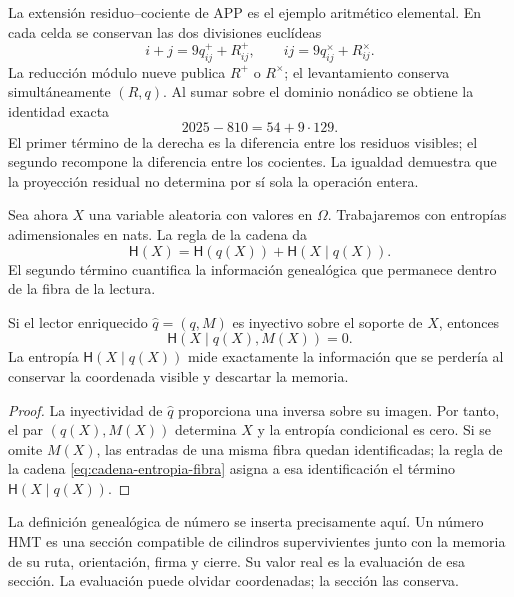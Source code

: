 La extensión residuo--cociente de APP es el ejemplo aritmético elemental. En
cada celda se conservan las dos divisiones euclídeas
\[
 i+j=9q^+_{ij}+R^+_{ij},
 \qquad
 ij=9q^\times_{ij}+R^\times_{ij}.
\]
La reducción módulo nueve publica \(R^+\) o \(R^\times\); el levantamiento
conserva simultáneamente \((R,q)\). Al sumar sobre el dominio nonádico se
obtiene la identidad exacta
\begin{equation}
 2025-810
 =54+9\cdot129.
 \label{eq:app-residuo-cociente-informacion}
\end{equation}
El primer término de la derecha es la diferencia entre los residuos visibles;
el segundo recompone la diferencia entre los cocientes. La igualdad demuestra
que la proyección residual no determina por sí sola la operación entera.

Sea ahora \(X\) una variable aleatoria con valores en \(\Omega\). Trabajaremos
con entropías adimensionales en nats. La regla de la cadena da
\begin{equation}
 \mathsf H(X)
 =\mathsf H(q(X))+\mathsf H(X\mid q(X)).
 \label{eq:cadena-entropia-fibra}
\end{equation}
El segundo término cuantifica la información genealógica que permanece dentro
de la fibra de la lectura.

\begin{theorem}
\label{thm:recuperabilidad-memoria-fibra}
Si el lector enriquecido \(\widehat q=(q,M)\) es inyectivo sobre el soporte de
\(X\), entonces
\begin{equation}
 \boxed{\mathsf H(X\mid q(X),M(X))=0.}
 \label{eq:entropia-condicional-memoria-cero}
\end{equation}
La entropía \(\mathsf H(X\mid q(X))\) mide exactamente la información que se
perdería al conservar la coordenada visible y descartar la memoria.
\end{theorem}

\begin{proof}
La inyectividad de \(\widehat q\) proporciona una inversa sobre su imagen. Por
tanto, el par \((q(X),M(X))\) determina \(X\) y la entropía condicional es
cero. Si se omite \(M(X)\), las entradas de una misma fibra quedan
identificadas; la regla de la cadena \eqref{eq:cadena-entropia-fibra} asigna a
esa identificación el término \(\mathsf H(X\mid q(X))\).
\end{proof}

La definición genealógica de número se inserta precisamente aquí. Un número
HMT es una sección compatible de cilindros supervivientes junto con la memoria
de su ruta, orientación, firma y cierre. Su valor real es la evaluación de esa
sección. La evaluación puede olvidar coordenadas; la sección las conserva.

